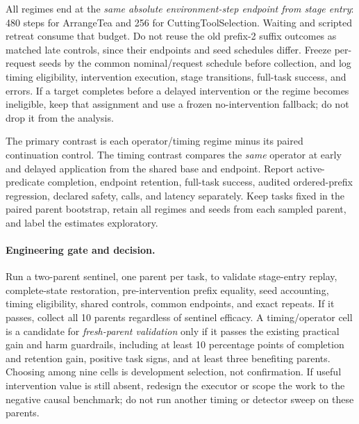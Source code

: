 All regimes end at the \emph{same absolute environment-step endpoint from stage entry}: 480 steps for ArrangeTea and 256 for CuttingToolSelection. Waiting and scripted retreat consume that budget. Do not reuse the old prefix-2 suffix outcomes as matched late controls, since their endpoints and seed schedules differ. Freeze per-request seeds by the common nominal/request schedule before collection, and log timing eligibility, intervention execution, stage transitions, full-task success, and errors. If a target completes before a delayed intervention or the regime becomes ineligible, keep that assignment and use a frozen no-intervention fallback; do not drop it from the analysis.

The primary contrast is each operator/timing regime minus its paired continuation control. The timing contrast compares the \emph{same} operator at early and delayed application from the shared base and endpoint. Report active-predicate completion, endpoint retention, full-task success, audited ordered-prefix regression, declared safety, calls, and latency separately. Keep tasks fixed in the paired parent bootstrap, retain all regimes and seeds from each sampled parent, and label the estimates exploratory.

\paragraph{Engineering gate and decision.}
Run a two-parent sentinel, one parent per task, to validate stage-entry replay, complete-state restoration, pre-intervention prefix equality, seed accounting, timing eligibility, shared controls, common endpoints, and exact repeats. If it passes, collect all 10 parents regardless of sentinel efficacy. A timing/operator cell is a candidate for \emph{fresh-parent validation} only if it passes the existing practical gain and harm guardrails, including at least 10 percentage points of completion and retention gain, positive task signs, and at least three benefiting parents. Choosing among nine cells is development selection, not confirmation. If useful intervention value is still absent, redesign the executor or scope the work to the negative causal benchmark; do not run another timing or detector sweep on these parents.

